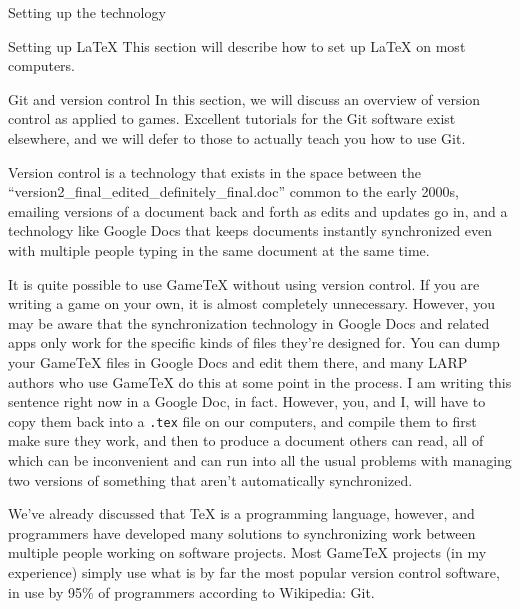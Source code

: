 \documentclass{article}
\newcommand{\gametex}{GameTeX}
\begin{document}
\begin{section}{Setting up the technology}
\begin{subsection}{Setting up \LaTeX{}}
This section will describe how to set up \LaTeX{} on most computers.
\end{subsection}
\begin{subsection}{Git and version control}
In this section, we will discuss an overview of version control as applied to games.  Excellent tutorials for the Git software exist elsewhere, and we will defer to those to actually teach you how to use Git.

Version control is a technology that exists in the space between the ``version2\_final\_edited\_definitely\_final.doc'' common to the early 2000s, emailing versions of a document back and forth as edits and updates go in, and a technology like Google Docs that keeps documents instantly synchronized even with multiple people typing in the same document at the same time.

It is quite possible to use \gametex{} without using version control.  If you are writing a game on your own, it is almost completely unnecessary.  However, you may be aware that the synchronization technology in Google Docs and related apps only work for the specific kinds of files they're designed for.  You can dump your \gametex{} files in Google Docs and edit them there, and many LARP authors who use \gametex{} do this at some point in the process.  I am writing this sentence right now in a Google Doc, in fact.  However, you, and I, will have to copy them back into a \texttt{.tex} file on our computers, and compile them to first make sure they work, and then to produce a document others can read, all of which can be inconvenient and can run into all the usual problems with managing two versions of something that aren't automatically synchronized.

We've already discussed that \TeX{} is a programming language, however, and programmers have developed many solutions to synchronizing work between multiple people working on software projects.  Most \gametex{} projects (in my experience) simply use what is by far the most popular version control software, in use by 95\% of programmers according to Wikipedia: Git.


\end{subsection}
\end{section}
\end{document}
